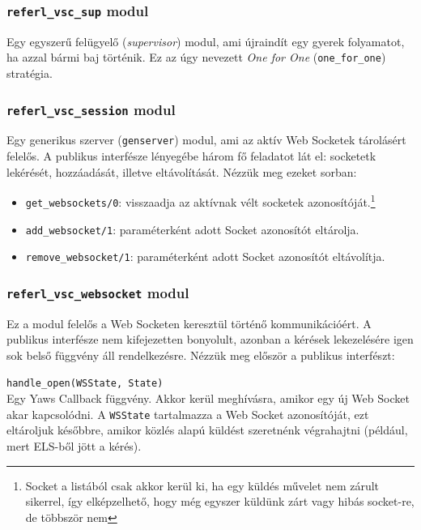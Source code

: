 \subsubsection{\lstinline{referl_vsc_sup} modul}

Egy egyszerű felügyelő (\textit{supervisor}) modul, ami újraindít egy gyerek folyamatot, ha azzal bármi baj történik. Ez az úgy nevezett \textit{One for One} (\lstinline{one_for_one}) stratégia. 

\subsubsection{\lstinline{referl_vsc_session} modul}

Egy generikus szerver (\lstinline{genserver}) modul, ami az aktív Web Socketek tárolásért 
felelős. A publikus interfésze lényegébe három fő feladatot lát el: socketetk lekérését, hozzáadását, illetve eltávolítását. Nézzük meg ezeket sorban:

\begin{itemize}
    \item \lstinline{get_websockets/0}: visszaadja az aktívnak vélt socketek azonosítóját.\footnote{Socket a listából csak akkor kerül ki, ha egy küldés művelet nem zárult sikerrel, így elképzelhető, hogy még egyszer küldünk zárt vagy hibás socket-re, de többször nem}
    \item \lstinline{add_websocket/1}: paraméterként adott Socket azonosítót eltárolja.
    \item \lstinline{remove_websocket/1}: paraméterként adott Socket azonosítót eltávolítja.
\end{itemize}



\subsubsection{\lstinline{referl_vsc_websocket} modul}

Ez a modul felelős a Web Socketen keresztül történő kommunikációért. A publikus interfésze nem kifejezetten bonyolult, azonban a kérések lekezelésére igen sok belső függvény áll rendelkezésre. Nézzük meg először a publikus interfészt:

\noindent \lstinline{handle_open(WSState, State)} \\
\noindent Egy Yaws Callback függvény. Akkor kerül meghívásra, amikor egy új Web Socket akar kapcsolódni. A \lstinline{WSState} tartalmazza a Web Socket azonosítóját, ezt eltároljuk későbbre, amikor közlés alapú küldést szeretnénk végrahajtni (például, mert ELS-ből jött a kérés).

